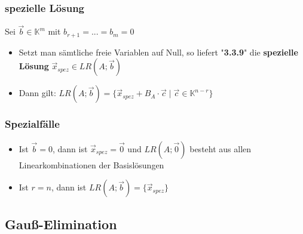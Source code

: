\documentclass[titlepage]{article}
\newcommand{\K}{\mathbb{K}}
\newcommand{\1}{\mathbb{1}}
\newcommand{\0}{\mathbb{0}}
\begin{document}
				\subsubsection{spezielle Lösung}
					Sei $\vec{b}\in\K^m$ mit $b_{r+1}=...=b_m=0$
					\begin{itemize}
						\item Setzt man sämtliche freie Variablen auf Null, so liefert "\textbf{3.3.9}" die \textbf{spezielle Lösung} $\vec{x}_{spez}\in LR(A;\vec{b})$
						\item Dann gilt: $LR(A;\vec{b})=\{\vec{x}_{spez}+B_A\cdot\vec{c}\mid\vec{c}\in\K^{n-r}\}$
					\end{itemize}
				\subsubsection{Spezialfälle}
					\begin{itemize}
						\item Ist $\vec{b}=0$, dann ist $\vec{x}_{spez}=\vec{0}$ und $LR(A;\vec{0})$ besteht aus allen Linearkombinationen der Basislösungen
						\item Ist $r=n$, dann ist $LR(A;\vec{b})=\{\vec{x}_{spez}\}$
					\end{itemize}
			\subsection{Gauß-Elimination}
\end{document}
